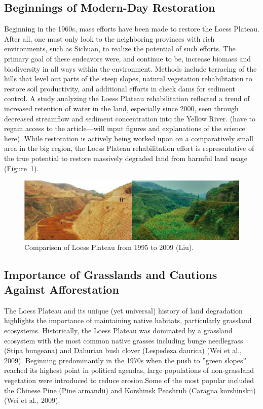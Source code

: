 \documentclass{book}\usepackage{knitr}
\begin{document}
\subsection{Beginnings of Modern-Day Restoration}
Beginning in the 1960s, mass efforts have been made to restore the Loess Plateau. After all, one must only look to the neighboring provinces with rich environments, such as Sichuan, to realize the potential of such efforts. The primary goal of these endeavors were, and continue to be, increase biomass and biodiversity in all ways within the environment. Methods include terracing of the hills that level out parts of the steep slopes, natural vegetation rehabilitation to restore soil productivity, and additional efforts in check dams for sediment control. A study analyzing the Loess Plateau rehabilitation reflected a trend of increased retention of water in the land, especially since 2000, seen through decreased streamflow and sediment concentration into the Yellow River. (have to regain access to the article—will input figures and explanations of the science here). While restoration is actively being worked upon on a comparatively small area in the big region, the Loess Plateau rehabilitation effort is representative of the true potential to restore massively degraded land from harmful land usage (Figure~\ref{fig:Loess-Comparison}).

\begin{figure}
\includegraphics[width=\linewidth]{images/land-use/Loess-Comparison.png}
\caption{Comparison of Loess Plateau from 1995 to 2009 (Liu).}
\label{fig:Loess-Comparison}
\end{figure}

\subsection{Importance of Grasslands and Cautions Against Afforestation}
The Loess Plateau and its unique (yet universal) history of land degradation highlights the importance of maintaining native habitats, particularly grassland ecosystems. Historically, the Loess Plateau was dominated by a grassland ecosystem with the most common native grasses including bunge needlegrass (Stipa bungeana) and Dahurian bush clover (Lespedeza daurica) (Wei et al., 2009). Beginning predominantly in the 1970s when the push to ''green slopes'' reached its highest point in political agendas, large populations of non-grassland vegetation were introduced to reduce erosion.Some of the most popular included the Chinese Pine (Pine armandii)  and Korshinsk Peashrub (Caragna korshinskii) (Wei et al., 2009).
\end{document}
